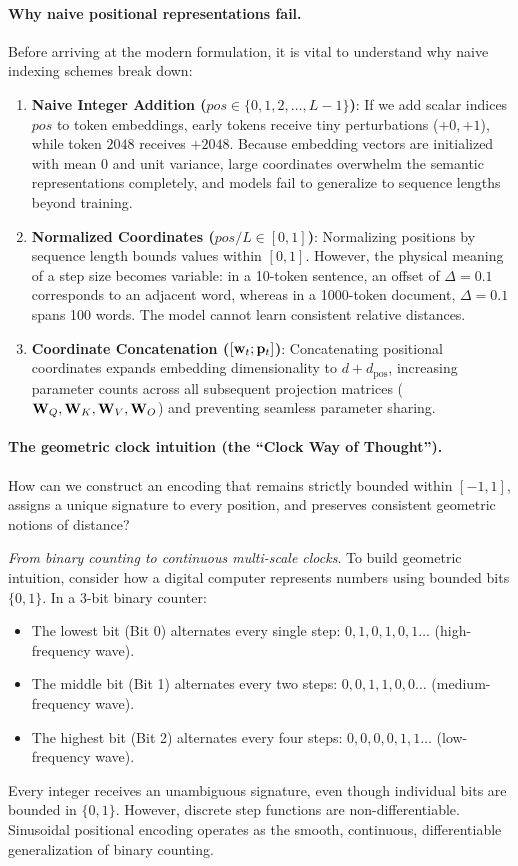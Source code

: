 \documentclass[../../main.tex]{subfiles}
\begin{document}
\paragraph{Why naive positional representations fail.}
Before arriving at the modern formulation, it is vital to understand why naive indexing schemes break down:
\begin{enumerate}
    \item \textbf{Naive Integer Addition ($pos \in \{0, 1, 2, \dots, L-1\}$)}: If we add scalar indices $pos$ to token embeddings, early tokens receive tiny perturbations ($+0, +1$), while token $2048$ receives $+2048$. Because embedding vectors are initialized with mean $0$ and unit variance, large coordinates overwhelm the semantic representations completely, and models fail to generalize to sequence lengths beyond training.
    \item \textbf{Normalized Coordinates ($pos / L \in [0, 1]$)}: Normalizing positions by sequence length bounds values within $[0, 1]$. However, the physical meaning of a step size becomes variable: in a 10-token sentence, an offset of $\Delta = 0.1$ corresponds to an adjacent word, whereas in a 1000-token document, $\Delta = 0.1$ spans 100 words. The model cannot learn consistent relative distances.
    \item \textbf{Coordinate Concatenation ($[\mathbf{w}_t; \mathbf{p}_t]$)}: Concatenating positional coordinates expands embedding dimensionality to $d + d_{\text{pos}}$, increasing parameter counts across all subsequent projection matrices ($\mathbf{W}_Q, \mathbf{W}_K, \mathbf{W}_V, \mathbf{W}_O$) and preventing seamless parameter sharing.
\end{enumerate}

\paragraph{The geometric clock intuition (the ``Clock Way of Thought'').}
How can we construct an encoding that remains strictly bounded within $[-1, 1]$, assigns a unique signature to every position, and preserves consistent geometric notions of distance?

\noindent\textit{From binary counting to continuous multi-scale clocks}.\newline
To build geometric intuition, consider how a digital computer represents numbers using bounded bits $\{0, 1\}$. In a 3-bit binary counter:
\begin{itemize}
    \item The lowest bit (Bit 0) alternates every single step: $0, 1, 0, 1, 0, 1 \dots$ (high-frequency wave).
    \item The middle bit (Bit 1) alternates every two steps: $0, 0, 1, 1, 0, 0 \dots$ (medium-frequency wave).
    \item The highest bit (Bit 2) alternates every four steps: $0, 0, 0, 0, 1, 1 \dots$ (low-frequency wave).
\end{itemize}
Every integer receives an unambiguous signature, even though individual bits are bounded in $\{0, 1\}$. However, discrete step functions are non-differentiable. Sinusoidal positional encoding operates as the smooth, continuous, differentiable generalization of binary counting.
\end{document}
